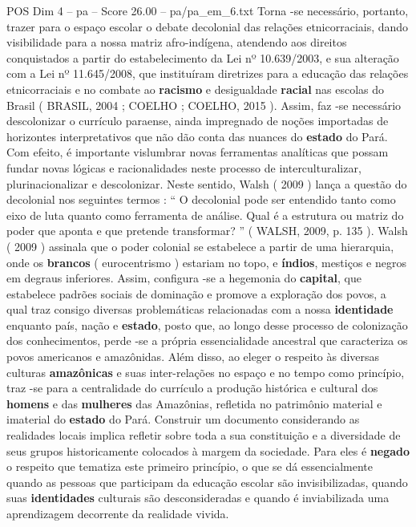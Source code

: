 \begin{textsample}{POS Dim 4 – pa – Score 26.00 – pa/pa\_em\_6.txt}
Torna -se necessário, portanto, trazer para o espaço escolar o debate decolonial das relações etnicorraciais, dando visibilidade para a nossa matriz afro-indígena, atendendo aos direitos conquistados a partir do estabelecimento da Lei nº 10.639/2003, e sua alteração com a Lei nº 11.645/2008, que instituíram diretrizes para a educação das relações etnicorraciais e no combate ao \textbf{racismo} e desigualdade \textbf{racial} nas escolas do Brasil ( BRASIL, 2004 ; COELHO ; COELHO, 2015 ).
Assim, faz -se necessário descolonizar o currículo paraense, ainda impregnado de noções importadas de horizontes interpretativos que não dão conta das nuances do \textbf{estado} do Pará.
Com efeito, é importante vislumbrar novas ferramentas analíticas que possam fundar novas lógicas e racionalidades neste processo de interculturalizar, plurinacionalizar e descolonizar.
Neste sentido, Walsh ( 2009 ) lança a questão do decolonial nos seguintes termos : “ O decolonial pode ser entendido tanto como eixo de luta quanto como ferramenta de análise.
Qual é a estrutura ou matriz do poder que aponta e que pretende transformar? ” ( WALSH, 2009, p. 135 ).
Walsh ( 2009 ) assinala que o poder colonial se estabelece a partir de uma hierarquia, onde os \textbf{brancos} ( eurocentrismo ) estariam no topo, e \textbf{índios}, mestiços e negros em degraus inferiores.
Assim, configura -se a hegemonia do \textbf{capital}, que estabelece padrões sociais de dominação e promove a exploração dos povos, a qual traz consigo diversas problemáticas relacionadas com a nossa \textbf{identidade} enquanto país, nação e \textbf{estado}, posto que, ao longo desse processo de colonização dos conhecimentos, perde -se a própria essencialidade ancestral que caracteriza os povos americanos e amazônidas.
Além disso, ao eleger o respeito às diversas culturas \textbf{amazônicas} e suas inter-relações no espaço e no tempo como princípio, traz -se para a centralidade do currículo a produção histórica e cultural dos \textbf{homens} e das \textbf{mulheres} das Amazônias, refletida no patrimônio material e imaterial do \textbf{estado} do Pará.
Construir um documento considerando as realidades locais implica refletir sobre toda a sua constituição e a diversidade de seus grupos historicamente colocados à margem da sociedade.
Para eles é \textbf{negado} o respeito que tematiza este primeiro princípio, o que se dá essencialmente quando as pessoas que participam da educação escolar são invisibilizadas, quando suas \textbf{identidades} culturais são desconsideradas e quando é inviabilizada uma aprendizagem decorrente da realidade vivida.

\end{textsample}
